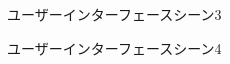 \begin{figure}[htbp]
    \begin{center}
    \end{center}
    \caption{ユーザーインターフェースシーン3}
    \label{fig:seen3}
\end{figure}

\begin{figure}[htbp]
    \begin{center}
    \end{center}
    \caption{ユーザーインターフェースシーン4}
    \label{fig:seen4}
\end{figure}

